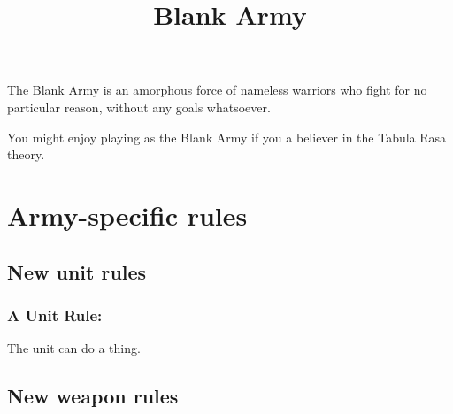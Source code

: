 








\title{Blank Army}

\maketitle

The Blank Army is an amorphous force of nameless warriors who fight for no particular reason, without any goals whatsoever.

You might enjoy playing as the Blank Army if you a believer in the Tabula Rasa theory.







\newcommand{\CombatKnife}[1][6+]{\textbf{Combat Knife}: R0 A1 {#1} D0}

\newcommand{\Ram}[1][7+]{\textbf{Ram}: R0 A1 {#1} D4 [Deadly 4]}


\newcommand{\Rifle}[1][6+]{\textbf{Rifle}: R20 A1 {#1} D1}

\newcommand{\TankGun}[1][5+]{\textbf{Tank Gun}: R8-40 A6 {#1} D5, [Area Effect, Deadly 2]}






\section*{Army-specific rules}


\subsection*{New unit rules}

\subsubsection*{A Unit Rule:} The unit can do a thing.



\subsection*{New weapon rules}


